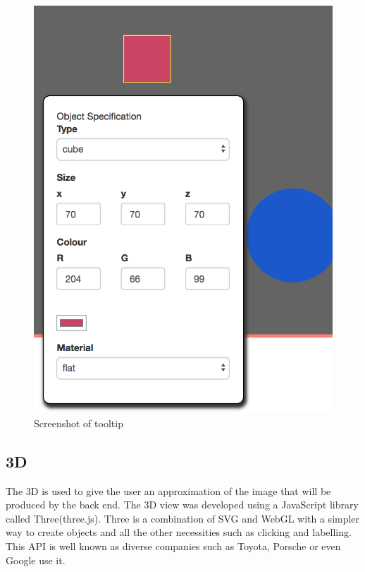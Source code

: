 \documentclass[a4paper]{report}
\begin{document}
	\begin{figure}[ht!]
		\centering
		\includegraphics[scale=0.30]{tooltip.png}
		\caption{Screenshot of tooltip}
		\label{fig:tooltip}
	\end{figure}
	
	\subsection{3D}
	The 3D is used to give the user an approximation of the image that will be produced by the back end. The 3D view was developed using a JavaScript library called Three(three.js)\cite{three.js_three.js_2018}. Three is a combination of SVG and WebGL with a simpler way to create objects and all the other necessities such as clicking and labelling. This API is well known as diverse companies\cite{three.js_three.js_2018} such as Toyota, Porsche or even Google \cite{google_rubiks_2014} use it.\newline
	
\end{document}
